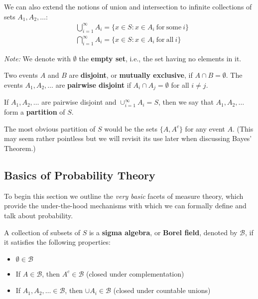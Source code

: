 We can also extend the notions of union and intersection to infinite collections of sets $A_1, A_2, \dots$:
\begin{align*}
    & \bigcup_{i=1}^{\infty}A_i = \{x \in S: x \in A_i \mathrm{\ for\ some\ } i\} \\
    & \bigcap_{i=1}^{\infty}A_i = \{x \in S: x \in A_i \mathrm{\ for\ all\ } i\} 
\end{align*}
\nextp

\textit{Note:} We denote with $\emptyset$ the \textbf{empty set}, i.e., the set having no elements in it.

\begin{definition}
    Two events $A$ and $B$ are \textbf{disjoint}, or \textbf{mutually exclusive}, if $A \cap B = \emptyset$. The events $A_1, A_2, \dots$ are \textbf{pairwise disjoint} if $A_i \cap A_j = \emptyset$ for all $i \neq j$.
\end{definition}

\begin{definition}
    If $A_1, A_2, \dots$ are pairwise disjoint and $\cup_{i=1}^{\infty}A_i = S$, then we say that $A_1, A_2, \dots$ form a \textbf{partition} of $S$.
\end{definition}

\begin{example}
    The most obvious partition of $S$ would be the sets $\{A, A^c\}$ for any event $A$. (This may seem rather pointless but we will revisit its use later when discussing Bayes' Theorem.)
\end{example}
\bigskip

\subsection*{Basics of Probability Theory}
To begin this section we outline the \textit{very basic} facets of measure theory, which provide the under-the-hood mechanisms with which we can formally define and talk about probability.
\begin{definition}
    A collection of subsets of $S$ is a \textbf{sigma algebra}, or \textbf{Borel field}, denoted by $\mathcal{B}$, if it satisfies the following properties:
    \begin{itemize}
        \item $\emptyset \in \mathcal{B}$
        \item If $A \in \mathcal{B}$, then $A^c \in \mathcal{B}$ \quad (closed under complementation)
        \item If $A_1, A_2, \dots \in \mathcal{B}$, then $\cup A_i \in \mathcal{B}$ \quad (closed under countable unions)
    \end{itemize}
\end{definition}

